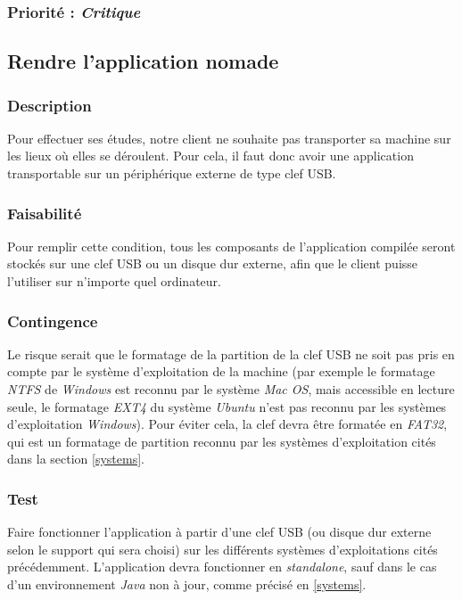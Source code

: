 \subsubsection{Priorité : \textit{Critique}}

\subsection{Rendre l'application nomade}\label{nomadite}

\subsubsection{Description}

Pour effectuer ses études, notre client ne souhaite pas transporter sa machine sur les lieux où elles se déroulent. Pour cela, il faut donc avoir une application transportable sur un périphérique externe de type clef USB.

\subsubsection{Faisabilité}

Pour remplir cette condition, tous les composants de l’application compilée seront stockés sur une clef USB ou un disque dur externe, afin que le client puisse l'utiliser sur n’importe quel ordinateur.

\subsubsection{Contingence}

Le risque serait que le formatage de la partition de la clef USB ne soit pas pris en compte par le système d’exploitation de la machine (par exemple le formatage \textit{NTFS} de \textit{Windows} est reconnu par le système \textit{Mac OS}, mais accessible en lecture seule, le formatage \textit{EXT4} du système \textit{Ubuntu} n’est pas reconnu par les systèmes d’exploitation \textit{Windows}). Pour éviter cela, la clef devra être formatée en \textit{FAT32}, qui est un formatage de partition reconnu par les systèmes d’exploitation cités dans la section \ref{systems}.

\subsubsection{Test}

Faire fonctionner l’application à partir d’une clef USB (ou disque dur externe selon le support qui sera choisi) sur les différents systèmes d’exploitations cités précédemment. L'application devra fonctionner en \textit{standalone}, sauf dans le cas d'un environnement \textit{Java} non à jour, comme précisé en \ref{systems}.

